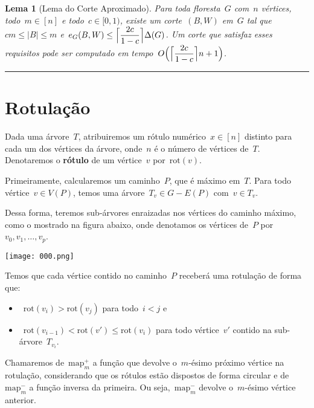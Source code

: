 \documentclass[a0,portrait]{a0poster}
\DeclarePairedDelimiter\ceil{\lceil}{\rceil}
\newtheorem{lem}{Lema}
\newcommand{\rot}{\mathrm{rot}}
\newcommand{\map}{\mathrm{map}}
\begin{document}
\begin{multicols}{3}
\medskip

\begin{lem}[Lema do Corte Aproximado]
    Para toda floresta~$G$ com~$n$ vértices, todo~${m \in [n]}$ e 
    todo~${c \in [0,1)}$, existe um corte~$(B,W)$ em~$G$ tal 
    que~${cm \le |B| \le m}$ 
    e~${e_G(B,W) \le \ceil[\Big]{ \dfrac{2c}{1-c}} \Delta(G)}$.
    Um corte que satisfaz esses requisitos pode ser computado em
    tempo~$O{\Big(\ceil[\Big]{ \dfrac{2c}{1-c}} n+1\Big)}$.
\end{lem}

\noindent\rule[0.5ex]{\linewidth}{1pt}



\section*{Rotulação}

    Dada uma árvore~$T$, atribuiremos um 
    rótulo numérico~${x\in [n]}$ distinto para cada um dos vértices 
    da árvore, onde~$n$ é o número de vértices de~$T$. 
    Denotaremos o \textbf{rótulo} de um vértice~$v$ por~$\rot(v)$.

    Primeiramente, calcularemos 
    um caminho~$P$, que é máximo em~$T$. 
    Para todo vértice~${v\in V(P)}$, temos uma 
    árvore~${T_v \in G - E(P)}$ com~$v\in T_v$.

    Dessa forma, teremos sub-árvores enraizadas nos vértices do
    caminho máximo, como o mostrado na figura abaixo, onde denotamos
    os vértices de~$P$ por~${v_0,v_1,\ldots,v_p}$.
    
    \begin{center}
    \texttt{[image: 000.png]}
    \end{center}
    Temos que cada vértice contido no caminho~$P$ receberá 
    uma rotulação de forma que:
    \begin{itemize}
        \item~${\rot(v_i)>\rot(v_j)}$ para todo~${i<j}$ e
        \item~${\rot(v_{i-1})<\rot(v') \le \rot(v_i)}$ para todo 
        vértice~$v'$ contido na sub-árvore~$T_{v_i}$. 
    \end{itemize}
    Chamaremos de~${\map^+_m}$ a função que devolve o~$m$-ésimo 
    próximo vértice na rotulação, considerando que os rótulos
    estão dispostos de forma circular
    e de~${\map^-_m}$ a função inversa da primeira. 
    Ou seja,~${\map^-_m}$ devolve o~$m$-ésimo vértice anterior.


\end{multicols}
\end{document}
